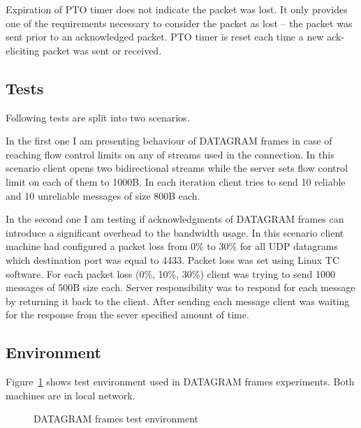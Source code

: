 Expiration of PTO timer does not indicate the packet was lost.
It only provides one of the requirements necessary to consider the packet as lost -- the packet was sent prior to an acknowledged packet.
PTO timer is reset each time a new ack-eliciting packet was sent or received.

\subsection{Tests}
\label{subsec:tests2}
Following tests are split into two scenarios.

In the first one I am presenting behaviour of DATAGRAM frames in case of reaching flow control limits on any of streams used in the connection.
In this scenario client opens two bidirectional streams while the server sets flow control limit on each of them to 1000B\@.
In each iteration client tries to send 10 reliable and 10 unreliable messages of size 800B each.

In the second one I am testing if acknowledgments of DATAGRAM frames can introduce a significant overhead to the bandwidth usage.
In this scenario client machine had configured a packet loss from 0\% to 30\% for all UDP datagrams which destination port was equal to 4433.
Packet loss was set using Linux TC software.
For each packet loss (0\%, 10\%, 30\%) client was trying to send 1000 messages of 500B size each.
Server responsibility was to respond for each message by returning it back to the client.
After sending each message client was waiting for the response from the sever specified amount of time.

\subsection{Environment}
\label{subsec:test-env}
Figure~\ref{fig:dgram-test-env} shows test environment used in DATAGRAM frames experiments.
Both machines are in local network.

\begin{figure}[h]
    \centering
    \caption{DATAGRAM frames test environment}
    \label{fig:dgram-test-env}
\end{figure}

